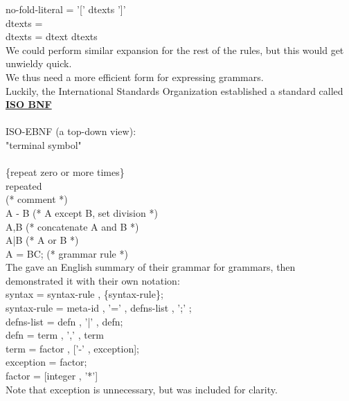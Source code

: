 \documentclass[../../lecture_notes.tex]{subfiles}
\begin{document}
	\indent no-fold-literal = '[' dtexts ']'\\
	\indent dtexts =\\
	\indent dtexts = dtext dtexts\\
We could perform similar expansion for the rest of the rules, but this would get unwieldy quick.\\
We thus need a more efficient form for expressing grammars.\\
Luckily, the International Standards Organization established a standard called \textbf{\underline{ISO BNF}}\\
\\
ISO-EBNF (a top-down view):\\
\indent "terminal symbol"\\
\indent [optional]\\
\indent \{repeat zero or more times\}\\
\indent *repeated\\
\indent (* comment *)\\
\indent A - B (* A except B, set division *)\\
\indent A,B (* concatenate A and B *)\\
\indent A|B (* A or B *)\\
\indent A = BC; (* grammar rule *)\\
The gave an English summary of their grammar for grammars, then demonstrated it with their own notation:\\
\indent syntax = syntax-rule , \{syntax-rule\};\\
\indent syntax-rule = meta-id , '=' , defns-list , ';' ;\\
\indent defns-list = defn , {'|' , defn};\\
\indent defn = term , {',' , term}\\
\indent term = factor , ['-' , exception];\\
\indent exception = factor;\\
\indent factor = [integer , '*']\\
Note that exception is unnecessary, but was included for clarity.\\
\newpage
\end{document}
